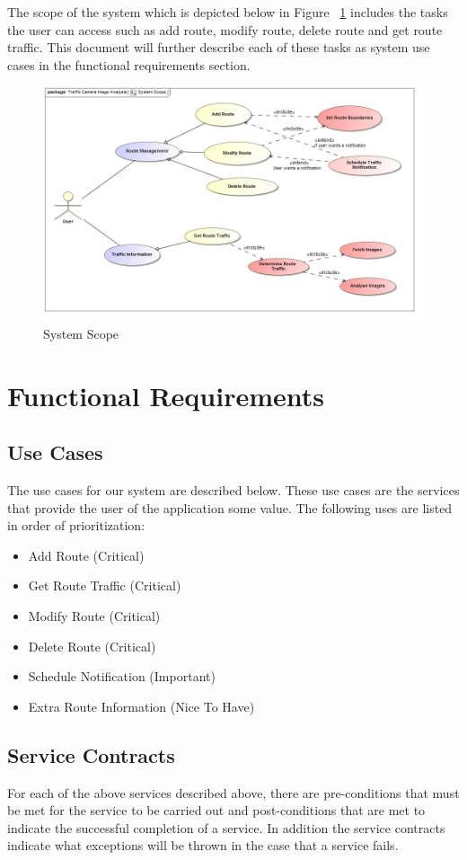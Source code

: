 \documentclass[a4paper,12pt]{article}
\begin{document}
The scope of the system which is depicted below in Figure ~\ref{fig:SystemScope} includes the tasks the user can access such as add route, modify route, delete route and get route traffic. This document will further describe each of these tasks as system use cases in the functional requirements section.
\begin{figure}[here]
\includegraphics[width=\textwidth]{images/System_Scope.jpg}
\caption{System Scope}
\label{fig:SystemScope}
\end{figure}

\section{Functional Requirements}
\subsection{Use Cases}
The use cases for our system are described below. These use cases are the services that provide the user of the application some value. The following uses are listed in order of prioritization:
\begin{itemize}
\item Add Route 			(Critical)
\item Get Route Traffic		(Critical)
\item Modify Route			(Critical)
\item Delete Route			(Critical)
\item Schedule Notification (Important)
\item Extra Route Information 	(Nice To Have)
\end{itemize}
\subsection{Service Contracts}
For each of the above services described above, there are pre-conditions that must be met for the service to be carried out and post-conditions that are met to indicate the successful completion of a service. In addition the service contracts indicate what exceptions will be thrown in the case that a service fails.
\end{document}

